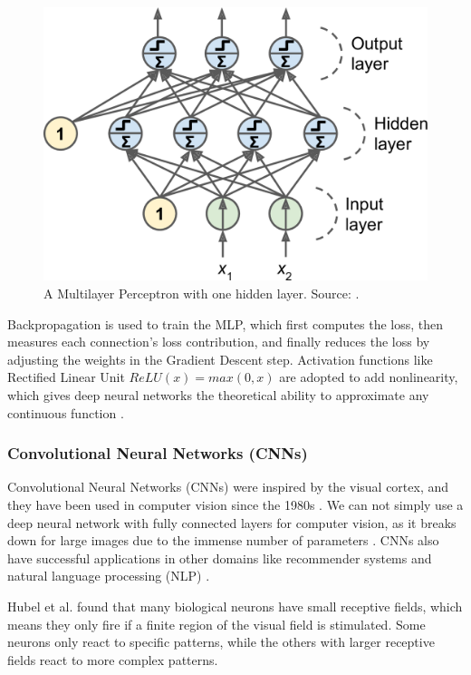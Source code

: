 \documentclass[a4paper, 11pt, oneside]{article}
\begin{document}
\begin{figure}[ht]
  \begin{center}
    \includegraphics[width=.5\textwidth]{mlp.png}
  \end{center}
  \caption{A Multilayer Perceptron with one hidden layer. Source: \cite{geron2019hands}.}
\end{figure}

Backpropagation \cite{rumelhart1985learning} is used to train the MLP, which first computes the loss, then measures each
connection's loss contribution, and finally reduces the loss by adjusting the weights in the Gradient Descent
\cite{ruder2016overview} step. Activation functions like Rectified Linear Unit $ReLU(x) = max(0, x)$ are adopted to add
nonlinearity, which gives deep neural networks the theoretical ability to approximate any continuous function
\cite{geron2019hands}.

\subsubsection{Convolutional Neural Networks (CNNs)}

\label{sec:cnn}

Convolutional Neural Networks (CNNs) \cite{lecun1989backpropagation} were inspired by the visual cortex, and they have
been used in computer vision since the 1980s \cite{geron2019hands}. We can not simply use a deep neural
network with fully connected layers for computer vision, as it breaks down for large images due to the immense
number of parameters \cite{geron2019hands}. CNNs also have successful applications in other domains like recommender
systems \cite{van2013deep} and natural language processing (NLP) \cite{collobert2008unified}.

Hubel et al. \cite{hubel1959single, hubel1959receptive, hubel1968receptive} found that many biological neurons have
small receptive fields, which means they only fire if a finite region of the visual field is stimulated. Some neurons
only react to specific patterns, while the others with larger receptive fields react to more complex patterns.
\end{document}
